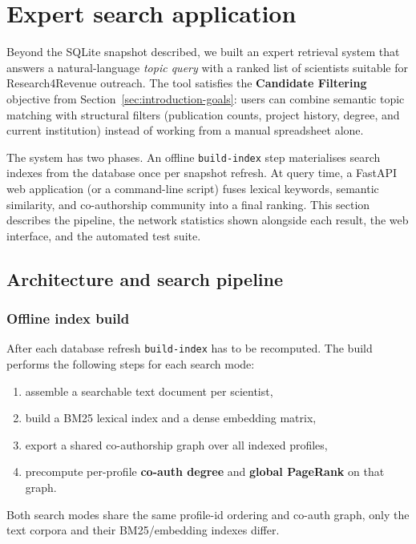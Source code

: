 \documentclass{article}
\begin{document}
\section{Expert search application}

Beyond the SQLite snapshot described, we built an expert retrieval system that answers a natural-language \emph{topic query} with a ranked list of scientists suitable for Research4Revenue outreach. The tool satisfies the \textbf{Candidate Filtering} objective from Section~\ref{sec:introduction-goals}: users can combine semantic topic matching with structural filters (publication counts, project history, degree, and current institution) instead of working from a manual spreadsheet alone.

The system has two phases. An offline \texttt{build-index} step materialises search indexes from the database once per snapshot refresh. At query time, a FastAPI web application (or a command-line script) fuses lexical keywords, semantic similarity, and co-authorship community into a final ranking. This section describes the pipeline, the network statistics shown alongside each result, the web interface, and the automated test suite.

\subsection{Architecture and search pipeline}

\subsubsection{Offline index build}

After each database refresh \texttt{build-index} has to be recomputed. The build performs the following steps for each search mode:
\begin{enumerate}[noitemsep]
  \item assemble a searchable text document per scientist,
  \item build a BM25 lexical index and a dense embedding matrix,
  \item export a shared co-authorship graph over all indexed profiles,
  \item precompute per-profile \textbf{co-auth degree} and \textbf{global PageRank} on that graph.
\end{enumerate}

Both search modes share the same profile-id ordering and co-auth graph, only the text corpora and their BM25/embedding indexes differ.
\end{document}
